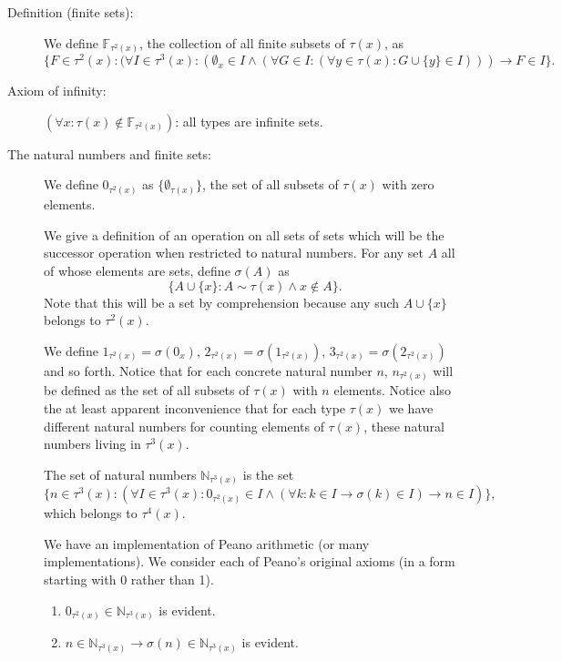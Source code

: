 \documentclass[12pt]{article}
\begin{document}
\begin{description}

\item[Definition (finite sets):]  We define $\mathbb F_{\tau^2(x)}$, the collection of all finite subsets of $\tau(x)$, as {\small $$\{F\in \tau^2(x):(\forall I \in \tau^3(x):(\emptyset_x \in I \wedge (\forall G \in I:(\forall y \in \tau(x):  G \cup \{y\} \in I))) \rightarrow F \in I\}.$$}

\item[Axiom of infinity:]  $(\forall x:\tau(x) \not\in \mathbb F_{\tau^2(x)})$:   all types are infinite sets.

\item[The natural numbers and finite sets:]  We define $0_{\tau^2(x)}$ as $\{\emptyset_{\tau(x)}\}$, the set of all subsets of $\tau(x)$ with zero elements.

We give a definition of an operation on all sets of sets which will be the successor operation when restricted to natural numbers.  For any set $A$ all of whose elements are sets, define $\sigma(A)$ as $$\{A \cup \{x\}:A \sim \tau(x) \wedge x \not\in A\}.$$ Note that this will be a set by comprehension because any such $A \cup \{x\}$ belongs to $\tau^2(x)$.

We define $1_{\tau^2(x)}= \sigma(0_x)$, $2_{\tau^2(x)} = \sigma(1_{\tau^2(x)})$, $3_{\tau^2(x)} = \sigma(2_{\tau^2(x)})$ and so forth.  Notice that for each concrete natural number $n$, $n_{\tau^2(x)}$ will be defined as the set of all subsets of $\tau(x)$ with $n$ elements.  Notice also the at least apparent inconvenience that for each type $\tau(x)$ we have different natural numbers for counting elements of $\tau(x)$, these natural numbers living in $\tau^3(x)$.

The set of natural numbers $\mathbb N_{\tau^3(x)}$ is the set $$\{n \in \tau^3(x):(\forall I\in \tau^3(x):  0_{\tau^2(x)} \in I \wedge (\forall k:k \in I \rightarrow \sigma(k)\in I) \rightarrow n \in I)\},$$ which belongs to $\tau^4(x)$.

We have an implementation of Peano arithmetic (or many implementations).  We consider each of Peano's original axioms (in a form starting with 0 rather than 1).

\begin{enumerate}

\item $0_{\tau^2(x)} \in \mathbb N_{\tau^3(x)}$ is evident.

\item $n \in \mathbb N_{\tau^3(x)} \rightarrow \sigma(n) \in \mathbb N_{\tau^3(x)}$ is evident.


\end{enumerate}
\end{description}
\end{document}
